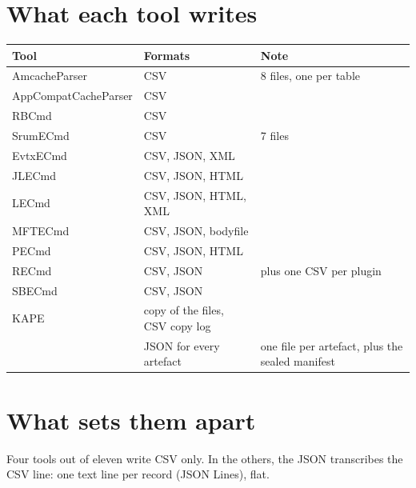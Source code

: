 \documentclass[11pt,a4paper,oneside]{report}
\begin{document}
\section{What each tool writes}

\begin{longtable}{@{}L{4.4cm}L{5.4cm}L{5.2cm}@{}}
\toprule
\textbf{Tool} & \textbf{Formats} & \textbf{Note} \\
\midrule\endhead
AmcacheParser & CSV & 8 files, one per table \\
AppCompatCacheParser & CSV & \\
RBCmd & CSV & \\
SrumECmd & CSV & 7 files \\
EvtxECmd & CSV, JSON, XML & \\
JLECmd & CSV, JSON, HTML & \\
LECmd & CSV, JSON, HTML, XML & \\
MFTECmd & CSV, JSON, bodyfile & \\
PECmd & CSV, JSON, HTML & \\
RECmd & CSV, JSON & plus one CSV per plugin \\
SBECmd & CSV, JSON & \\
KAPE & copy of the files, CSV copy log & \\
\wac{} & JSON for every artefact & one file per artefact, plus the sealed manifest \\
\bottomrule
\end{longtable}

\section{What sets them apart}

Four tools out of eleven write CSV only. In the others, the JSON transcribes the
CSV line: one text line per record (JSON Lines), flat.
\end{document}
